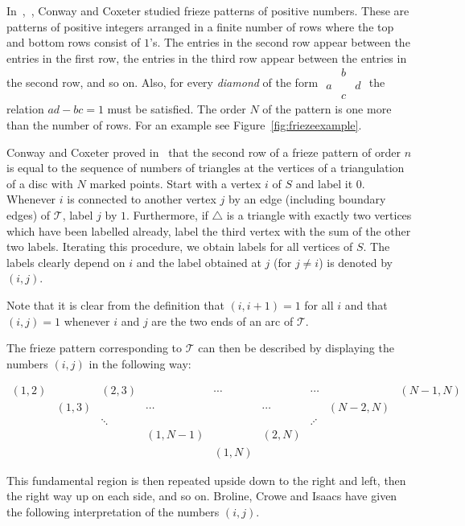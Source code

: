 \documentclass[a4paper]{amsart}
\begin{document}
In~\cite{cc73a},~\cite{cc73b}, Conway and Coxeter studied frieze patterns of
positive numbers. These are patterns of positive integers arranged
in a finite number of rows where the top and bottom rows consist of $1$'s.
The entries in the second row appear between the entries in the first
row, the entries in the third row appear between the entries in the second
row, and so on. Also, for every {\em diamond} of the form
$\begin{array}{rcl}
 & b \\
a & & d \\
 & c
\end{array}$
the relation $ad-bc=1$ must be satisfied. The order $N$ of the pattern is one
more than the number of rows. For an example see
Figure~\ref{fig:friezeexample}.

Conway and Coxeter proved in~\cite{cc73a,cc73b} that the second row
of a frieze pattern of order $n$ is equal to the sequence of numbers of
triangles at the vertices of a triangulation of a disc with $N$ marked
points.
Start with a vertex $i$ of $S$ and label it $0$. Whenever $i$ is connected
to another vertex $j$ by an edge (including boundary edges) of ${\mathcal T}$,
label $j$ by $1$. Furthermore, if $\triangle$ is a triangle with exactly
two vertices which have been labelled already, label the third vertex with
the sum of the other two labels. Iterating this procedure, we obtain
labels for all vertices of $S$. The labels clearly depend on $i$
and the label obtained at $j$ (for $j\neq i$) is denoted by $(i,j)$.

\begin{remark} \label{rem:unpuncturedone}
Note that it is clear from the definition that $(i,i+1)=1$ for all $i$
and that $(i,j)=1$ whenever $i$ and $j$ are the two ends of an arc of ${\mathcal T}$.
\end{remark}

The frieze pattern corresponding to ${\mathcal T}$ can then be described by
displaying the numbers $(i,j)$ in the following way:

$$
\begin{array}{ccccccccc}
(1,2) && (2,3) && \cdots && \cdots && (N-1,N) \\
& (1,3) && \cdots && \cdots && (N-2,N) & \\
&& \ddots &&  && \iddots && \\
&&& (1,N-1) && (2,N) &&& \\
&&&& (1,N) &&&&
\end{array}
$$

This fundamental region is then repeated upside down to the right
and left, then the right way up on each side, and so on.
Broline, Crowe and Isaacs have given the following interpretation of the
numbers $(i,j)$.
\end{document}
